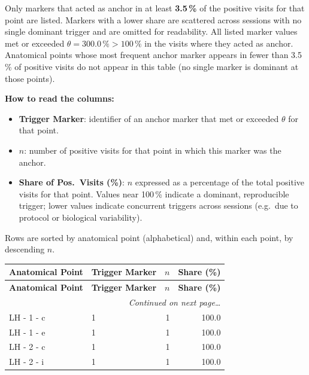 \documentclass[a4paper,11pt]{article}
\begin{document}
\medskip
Only markers that acted as anchor in at least \textbf{3.5\,\%}
of the positive visits for that point are listed.
Markers with a lower share are scattered across sessions with no single dominant trigger
and are omitted for readability.
All listed marker values met or exceeded $\theta = 300.0\,\% > 100\,\%$ in the
visits where they acted as anchor.
Anatomical points whose most frequent anchor marker appears in fewer than
3.5\,\% of positive visits do not appear in this table (no single
marker is dominant at those points).

\medskip
\noindent\textbf{How to read the columns:}
\begin{itemize}
  \item \textbf{Trigger Marker}: identifier of an anchor marker that met or exceeded $\theta$
        for that point.
  \item \textbf{$n$}: number of positive visits for that point in which this marker was
        the anchor.
  \item \textbf{Share of Pos.\ Visits (\%)}: $n$ expressed as a percentage of the total
        positive visits for that point.
        Values near 100\,\% indicate a dominant, reproducible trigger;
        lower values indicate concurrent triggers across sessions (e.g.\ due to
        protocol or biological variability).
\end{itemize}

\medskip
\noindent Rows are sorted by anatomical point (alphabetical) and, within each point, by
descending $n$.

\begin{footnotesize}
\begin{longtable}{p{3.5cm}p{7.5cm}rr}
\toprule
\textbf{Anatomical Point} &
\textbf{Trigger Marker} &
\textbf{$n$} &
\textbf{Share (\%)} \\
\midrule
\endfirsthead
\toprule
\textbf{Anatomical Point} &
\textbf{Trigger Marker} &
\textbf{$n$} &
\textbf{Share (\%)} \\
\midrule
\endhead
\midrule
\multicolumn{4}{r}{\footnotesize\emph{Continued on next page\ldots}} \\
\endfoot
\bottomrule
\endlastfoot
LH - 1 - c & 1 & 1 & 100.0 \\
LH - 1 - e & 1 & 1 & 100.0 \\
LH - 2 - c & 1 & 1 & 100.0 \\
LH - 2 - i & 1 & 1 & 100.0 \\
\end{longtable}
\end{footnotesize}
\end{document}
